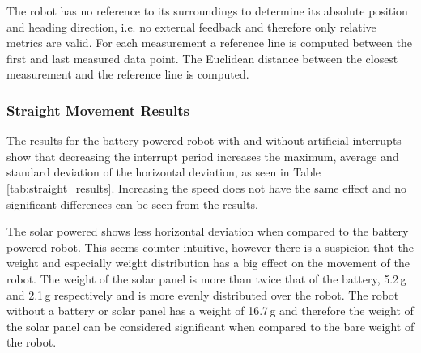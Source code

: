 The robot has no reference to its surroundings to determine its absolute position and heading direction, i.e. no external feedback and therefore only relative metrics are valid.
For each measurement a reference line is computed between the first and last measured data point.
The Euclidean distance between the closest measurement and the reference line is computed.

\subsubsection{Straight Movement Results}

The results for the battery powered robot with and without artificial interrupts show that decreasing the interrupt period increases the maximum, average and standard deviation of the horizontal deviation, as seen in Table \ref{tab:straight_results}.
Increasing the speed does not have the same effect and no significant differences can be seen from the results.

The solar powered shows less horizontal deviation when compared to the battery powered robot.
This seems counter intuitive, however there is a suspicion that the weight and especially weight distribution has a big effect on the movement of the robot.
The weight of the solar panel is more than twice that of the battery, 5.2\,g and 2.1\,g respectively and is more evenly distributed over the robot.
The robot without a battery or solar panel has a weight of 16.7\,g and therefore the weight of the solar panel can be considered significant when compared to the bare weight of the robot.

